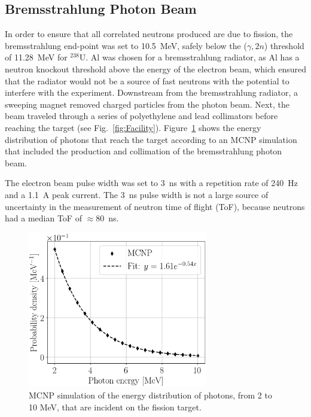 \subsection{Bremsstrahlung Photon Beam}
\label{beam}
In order to ensure that all correlated neutrons produced are due to fission, the bremsstrahlung end-point was set to 10.5~MeV, safely below the ($\gamma, 2n$) threshold of 11.28~MeV for $^{238}$U.
Al was chosen for a bremsstrahlung radiator, as Al has a neutron knockout threshold above the energy of the electron beam, which ensured that the radiator would not be a source of fast neutrons with the potential to interfere with the experiment.
Downstream from the bremsstrahlung radiator, a sweeping magnet removed charged particles from the photon beam.
Next, the beam traveled through a series of polyethylene and lead collimators before reaching the target (see Fig.~\ref{fig:Facility}).
Figure~\ref{fig:BremDist} shows the energy distribution of photons that reach the target according to an MCNP simulation that included the production and collimation of the bremsstrahlung photon beam.

The electron beam pulse width was set to 3~ns with a repetition rate of 240~Hz and a 1.1~A peak current.
The 3~ns pulse width is not a large source of uncertainty in the measurement of neutron time of flight (ToF), because neutrons had a median ToF of $\approx$80~ns.

\begin{figure}[h]
\centering
\includegraphics[width=0.7\textwidth]{Content/Methods/MCNPBremDistribution.png}
\caption{MCNP simulation of the energy distribution of photons, from 2 to 10 MeV, that are incident on the fission target.}
\label{fig:BremDist}
\end{figure}
